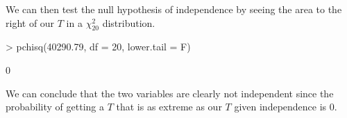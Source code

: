 \documentclass{beamer}
\begin{document}
\begin{frame}[fragile]
We can then test the null hypothesis of independence by seeing the
area to the right of our $T$ in a $\chi^2_{20}$ distribution.
\tiny
\pause
\medskip
\begin{Schunk}
\begin{Sinput}
> pchisq(40290.79, df = 20, lower.tail = F)
\end{Sinput}
\begin{Soutput}
[1] 0
\end{Soutput}
\end{Schunk}
\normalsize
\pause
\bigskip
We can conclude that the two variables are clearly not independent since
the probability of getting a $T$ that is as extreme as our $T$ given
independence is 0.
\end{frame}
\end{document}
